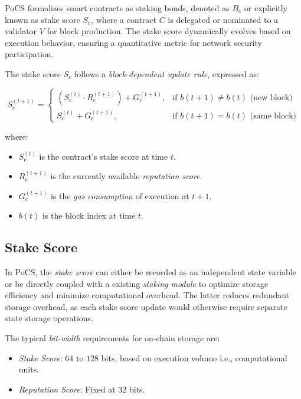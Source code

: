 \documentclass{article}
\begin{document}
PoCS formalizes smart contracts as staking bonds, denoted as $B_c$ or explicitly known as stake score $S_c$, where a contract $C$ is delegated or nominated to a validator $V$ for block production. The stake score dynamically evolves based on execution behavior, ensuring a quantitative metric for network security participation.  

The stake score $S_c$ follows a \textit{block-dependent update rule}, expressed as:  

\begin{equation}
S_c^{(t+1)} =
\begin{cases} 
(S_c^{(t)} \cdot R_c^{(t+1)}) + G_c^{(t+1)}, & \text{if } b(t+1) \neq b(t) \text{ (new block)} \\
S_c^{(t)} + G_c^{(t+1)}, & \text{if } b(t+1) = b(t) \text{ (same block)}
\end{cases}
\end{equation}

where:  
\begin{itemize}
    \item $S_c^{(t)}$ is the contract’s stake score at time $t$.  
    \item $R_c^{(t+1)}$ is the currently available \textit{reputation score}.  
    \item $G_c^{(t+1)}$ is the \textit{gas consumption} of execution at $t+1$.  
    \item $b(t)$ is the block index at time $t$.  
\end{itemize}

\subsection{Stake Score}

In PoCS, the \textit{stake score} can either be recorded as an independent state variable or be directly coupled with a existing \textit{staking module} to optimize storage efficiency and minimize computational overhead. The latter reduces redundant storage overhead, as each stake score update would otherwise require separate state storage operations.  

The typical \textit{bit-width} requirements for on-chain storage are:  
\begin{itemize}
\item \textit{Stake Score}: $64$ to $128$ bits, based on execution volume i.e., computational units.  
\item \textit{Reputation Score}: Fixed at $32$ bits.  
\end{itemize}
\end{document}
